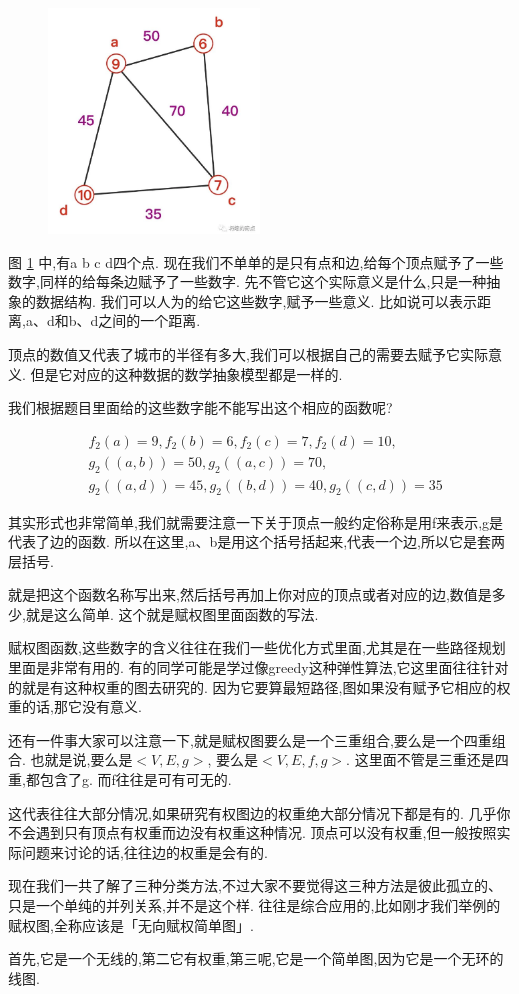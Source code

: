 \begin{figure}[ht]
  \centering
  \includegraphics[width=0.5\textwidth]{asset/20231227145314.png}
  \caption{}
  \label{fig:img25_12}
\end{figure}

图 \ref{fig:img25_12} 中,有a b c d四个点. 现在我们不单单的是只有点和边,给每个顶点赋予了一些数字,同样的给每条边赋予了一些数字. 先不管它这个实际意义是什么,只是一种抽象的数据结构. 我们可以人为的给它这些数字,赋予一些意义. 比如说可以表示距离,a、d和b、d之间的一个距离. 

顶点的数值又代表了城市的半径有多大,我们可以根据自己的需要去赋予它实际意义. 但是它对应的这种数据的数学抽象模型都是一样的. 

我们根据题目里面给的这些数字能不能写出这个相应的函数呢? 

\begin{align*}
  & f_2(a)=9, f_2(b)=6, f_2(c)=7, f_2(d)=10, \\ 
  & g_2((a,b))=50, g_2((a,c))=70, \\ 
  & g_2((a,d))=45, g_2((b,d))=40, g_2((c,d))=35
\end{align*}

其实形式也非常简单,我们就需要注意一下关于顶点一般约定俗称是用f来表示,g是代表了边的函数. 所以在这里,a、b是用这个括号括起来,代表一个边,所以它是套两层括号. 

就是把这个函数名称写出来,然后括号再加上你对应的顶点或者对应的边,数值是多少,就是这么简单. 这个就是赋权图里面函数的写法. 

赋权图函数,这些数字的含义往往在我们一些优化方式里面,尤其是在一些路径规划里面是非常有用的. 有的同学可能是学过像greedy这种弹性算法,它这里面往往针对的就是有这种权重的图去研究的. 因为它要算最短路径,图如果没有赋予它相应的权重的话,那它没有意义. 

还有一件事大家可以注意一下,就是赋权图要么是一个三重组合,要么是一个四重组合. 也就是说,要么是$<V,E,g>$, 要么是$<V,E,f,g>$. 这里面不管是三重还是四重,都包含了g. 而f往往是可有可无的. 

这代表往往大部分情况,如果研究有权图边的权重绝大部分情况下都是有的. 几乎你不会遇到只有顶点有权重而边没有权重这种情况. 顶点可以没有权重,但一般按照实际问题来讨论的话,往往边的权重是会有的. 

现在我们一共了解了三种分类方法,不过大家不要觉得这三种方法是彼此孤立的、只是一个单纯的并列关系,并不是这个样. 往往是综合应用的,比如刚才我们举例的赋权图,全称应该是「无向赋权简单图」. 

首先,它是一个无线的,第二它有权重,第三呢,它是一个简单图,因为它是一个无环的线图. 